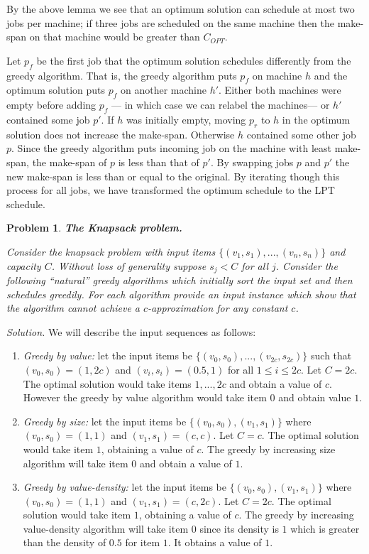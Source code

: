\documentclass[11pt]{article}
\newtheorem{problem}{Problem}
\begin{document}
\begin{enumerate}
\begin{prf}
By the above lemma we see that an optimum solution can schedule at most two jobs per machine; if three jobs are scheduled on the same machine then the make-span on that machine would be greater than $C_{OPT}$.

Let $p_f$ be the first job that the optimum solution schedules differently from the greedy algorithm. That is, the greedy algorithm puts $p_f$ on machine $h$ and the optimum solution puts $p_f$ on another machine $h'$. Either both machines were empty before adding $p_f$ --- in which case we can relabel the machines--- or $h'$ contained some job $p'$. If $h$ was initially empty, moving $p_r$ to $h$ in the optimum solution does not increase the make-span. Otherwise $h$ contained some other job $p$. Since the greedy algorithm puts incoming job on the machine with least make-span, the make-span of $p$ is less than that of $p'$. By swapping jobs $p$ and $p'$ the new make-span is less than or equal to the original. By iterating though this process for all jobs, we have transformed the optimum schedule to the LPT schedule.
\end{prf}
\end{enumerate}



\begin{problem}
\textbf{The Knapsack problem.} 

Consider the knapsack problem with input items $\{(v_1, s_1), ..., (v_n, s_n)\}$ and capacity $C$. Without loss of generality suppose $s_j < C$ for all $j$. Consider the following ``natural'' greedy algorithms which initially sort the input set and then schedules greedily. For each algorithm provide an input instance which show that the algorithm cannot achieve a $c$-approximation for any constant $c$. 
\end{problem}
\emph{Solution.} We will describe the input sequences  as follows:
\begin{enumerate}
\item \emph{Greedy by value:} let the input items be $\{(v_0, s_0), ..., (v_{2c}, s_{2c})\}$ such that $(v_0, s_0) = (1, 2c)$ and $(v_i, s_i) = (0.5, 1)$ for all $1 \leq i \leq 2c$. Let $C = 2c$. The optimal solution would take items $1, ..., 2c$ and obtain a value of $c$. However the greedy by value algorithm would take item $0$ and obtain value $1$.    
\item \emph{Greedy by size:} let the input items be $\{(v_0, s_0), (v_1, s_1)\}$ where $(v_0, s_0) = (1,1)$ and $(v_1, s_1) = (c, c)$. Let $C = c$. The optimal solution would take item $1$, obtaining a value of $c$. The greedy by increasing size algorithm will take item $0$ and obtain a value of $1$.
\item \emph{Greedy by value-density:} let the input items be $\{(v_0, s_0), (v_1, s_1)\}$ where $(v_0, s_0) = (1,1)$ and $(v_1, s_1) = (c, 2c)$. Let $C = 2c$. The optimal solution would take item $1$, obtaining a value of $c$. The greedy by increasing value-density algorithm will take item $0$ since its density is $1$ which is greater than the density of $0.5$ for item $1$. It obtains a value of $1$.
\linebreak
\end{enumerate}
\end{document}
